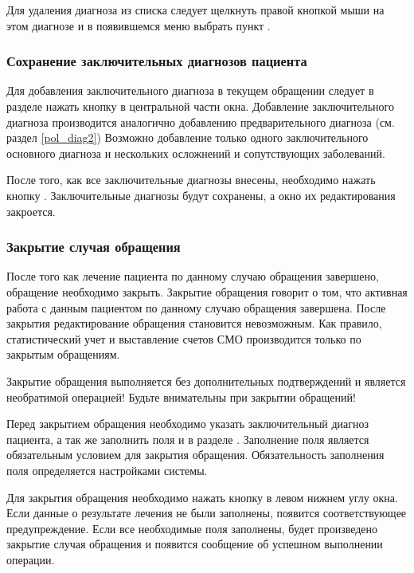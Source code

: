 Для удаления диагноза из списка следует щелкнуть правой кнопкой мыши на этом диагнозе и в появившемся меню выбрать пункт .

\subsubsection{Сохранение заключительных диагнозов пациента}

Для добавления заключительного диагноза в текущем обращении следует в разделе  нажать кнопку  в центральной части окна. Добавление заключительного диагноза производится аналогично добавлению предварительного диагноза (см. раздел \ref{pol_diag2}) Возможно добавление только одного заключительного основного диагноза и нескольких осложнений и сопутствующих заболеваний.

После того, как все заключительные диагнозы внесены, необходимо нажать кнопку . Заключительные диагнозы будут сохранены, а окно их редактирования закроется.

\subsubsection{Закрытие случая обращения}

После того как лечение пациента по данному случаю обращения завершено, обращение необходимо закрыть. Закрытие обращения говорит о том, что активная работа с данным пациентом по данному случаю обращения завершена. После закрытия редактирование обращения становится невозможным. Как правило, статистический учет и выставление счетов СМО производится только по закрытым обращениям.

\begin{vnim}
 Закрытие обращения выполняется без дополнительных подтверждений и является необратимой операцией! Будьте внимательны при закрытии обращений!
\end{vnim} 
 
Перед закрытием обращения необходимо указать заключительный диагноз пациента, а так же заполнить поля  и  в разделе . Заполнение поля  является обязательным условием для закрытия обращения. Обязательность заполнения поля  определяется настройками системы.

Для закрытия обращения необходимо нажать кнопку  в левом нижнем углу окна. Если данные о результате лечения не были заполнены, появится соответствующее предупреждение. Если все необходимые поля заполнены, будет произведено закрытие случая обращения и появится сообщение об успешном выполнении операции.

